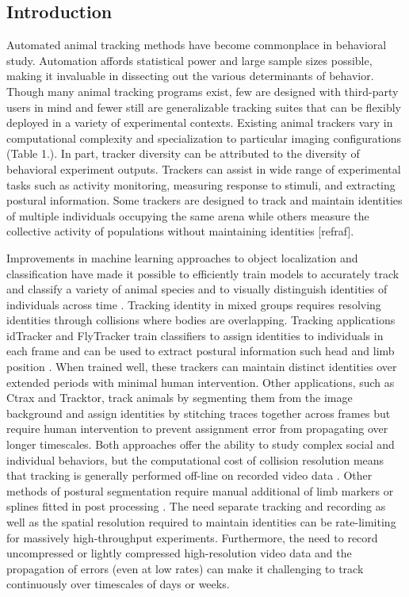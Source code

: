 \documentclass[10pt]{article}
\begin{document}
\vspace{1cm}
\begin{multicols}{2}
\section*{Introduction}

Automated animal tracking methods have become commonplace in behavioral study. Automation affords statistical power and large sample sizes possible, making it invaluable in dissecting out the various determinants of behavior. Though many animal tracking programs exist, few are designed with third-party users in mind and fewer still are generalizable tracking suites that can be flexibly deployed in a variety of experimental contexts. Existing animal trackers vary in computational complexity and specialization to particular imaging configurations (Table 1.). In part, tracker diversity can be attributed to the diversity of behavioral experiment outputs. Trackers can assist in wide range of experimental tasks such as activity monitoring, measuring response to stimuli, and extracting postural information. Some trackers are designed to track and maintain identities of multiple individuals occupying the same arena while others measure the collective activity of populations without maintaining identities [refraf]. 

Improvements in machine learning approaches to object localization and classification have made it possible to efficiently train models to accurately track and classify a variety of animal species and to visually distinguish identities of individuals across time \cite{Eyjolfsdottir_Detecting_2014,Prez-Escudero_idTracker_2014}. Tracking identity in mixed groups requires resolving identities through collisions where bodies are overlapping. Tracking applications idTracker and FlyTracker train classifiers to assign identities to individuals in each frame and can be used to extract postural information such head and limb position \cite{Eyjolfsdottir_Detecting_2014}. When trained well, these trackers can maintain distinct identities over extended periods with minimal human intervention. Other applications, such as Ctrax and Tracktor\cite{Branson_High_2009,Sridhar_Tracktor_2018}, track animals by segmenting them from the image background and assign identities by stitching traces together across frames but require human intervention to prevent assignment error from propagating over longer timescales. Both approaches offer the ability to study complex social and individual behaviors, but the computational cost of collision resolution means that tracking is generally performed off-line on recorded video data \cite{Liu_A_2018}. Other methods of postural segmentation require manual additional of limb markers or splines fitted in post processing \cite{Kain_Leg_2013,Uhlmann_FlyLimbTracker_2017}. The need separate tracking and recording as well as the spatial resolution required to maintain identities can be rate-limiting for massively high-throughput experiments. Furthermore, the need to record uncompressed or lightly compressed high-resolution video data and the propagation of errors (even at low rates) can make it challenging to track continuously over timescales of days or weeks.


\end{multicols}
\end{document}
